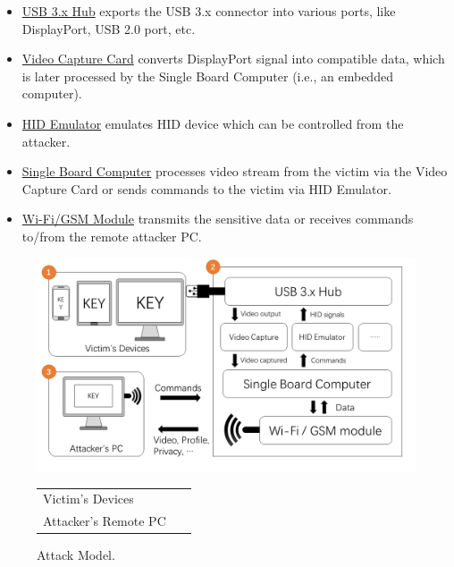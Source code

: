 
\begin{itemize}
	
	\item\underline{USB 3.x Hub} exports the USB 3.x connector into various ports, like DisplayPort, USB 2.0 port, etc.
	
	\item\underline{Video Capture Card} converts DisplayPort signal into compatible data, which is later processed by the Single Board Computer (i.e., an embedded computer).
	
	\item\underline{HID Emulator} emulates HID device which can be controlled from the attacker.
	
	\item\underline{Single Board Computer} processes video stream from the victim via the Video Capture Card or sends commands to the victim via HID Emulator.
	
	\item\underline{Wi-Fi/GSM Module} transmits the sensitive data or receives commands to/from the remote attacker PC.

\end{itemize}


\begin{figure}[t]
	\centering
	\includegraphics[width=\linewidth]{./Figs/attack_model.png}

	\begin{tabular}{ll}
	\circled[text=white,fill=myyellow]{\footnotesize{1}} Victim's Devices    &\circled[text=white,fill=myyellow]{\footnotesize{2}}~\tool\\
	\circled[text=white,fill=myyellow]{\footnotesize{3}} Attacker's Remote PC
	\end{tabular}

	\caption{Attack Model.}%
	\label{fig:attack_model}
\end{figure}

